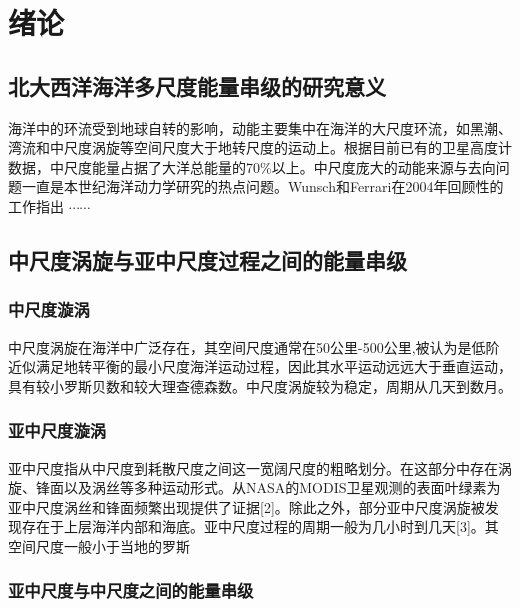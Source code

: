 \chapter{绪论}


\section{北大西洋海洋多尺度能量串级的研究意义}

海洋中的环流受到地球自转的影响，动能主要集中在海洋的大尺度环流，如黑潮、湾流和中尺度涡旋等空间尺度大于地转尺度的运动上。根据目前已有的卫星高度计数据，中尺度能量占据了大洋总能量的70\%以上。中尺度庞大的动能来源与去向问题一直是本世纪海洋动力学研究的热点问题。Wunsch和Ferrari在2004年回顾性的工作指出 $\cdots\cdots$ 


\section{中尺度涡旋与亚中尺度过程之间的能量串级}

\subsection{中尺度漩涡}

中尺度涡旋在海洋中广泛存在，其空间尺度通常在50公里-500公里,被认为是低阶近似满足地转平衡的最小尺度海洋运动过程，因此其水平运动远远大于垂直运动，具有较小罗斯贝数和较大理查德森数。中尺度涡旋较为稳定，周期从几天到数月。

\subsection{亚中尺度漩涡}

亚中尺度指从中尺度到耗散尺度之间这一宽阔尺度的粗略划分。在这部分中存在涡旋、锋面以及涡丝等多种运动形式。从NASA的MODIS卫星观测的表面叶绿素为亚中尺度涡丝和锋面频繁出现提供了证据[2]。除此之外，部分亚中尺度涡旋被发现存在于上层海洋内部和海底。亚中尺度过程的周期一般为几小时到几天[3]。其空间尺度一般小于当地的罗斯

\subsection{亚中尺度与中尺度之间的能量串级}


